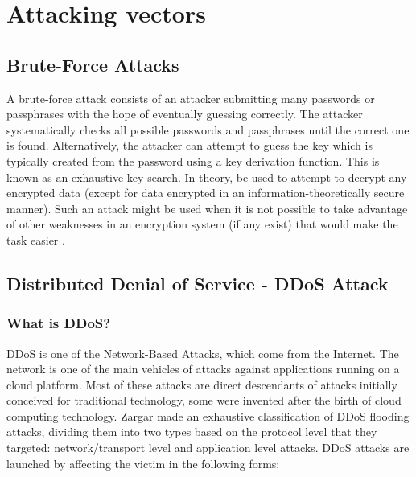 \documentclass[twocolumn]{article}
\begin{document}
\section{Attacking vectors}
\subsection{Brute-Force Attacks}

A brute-force attack consists of an attacker submitting many passwords or passphrases with the hope of eventually guessing correctly.
The attacker systematically checks all possible passwords and passphrases until the correct one is found. Alternatively, the attacker can attempt to guess the key which is typically created from the password using a key derivation function.
This is known as an exhaustive key search.
In theory, be used to attempt to decrypt any encrypted data (except for data encrypted in an information-theoretically secure manner). Such an attack might be used when it is not possible to take advantage of other weaknesses in an encryption system (if any exist) that would make the task easier \cite{kanakam2022bruteforce}.
\subsection{Distributed Denial of Service - DDoS Attack}
\subsubsection{What is DDoS?}
\par DDoS \cite{coppolino2017cloud} is one of the Network-Based Attacks, which come from the Internet. The network is one of the main vehicles of attacks against applications running on a cloud platform. Most of these attacks are direct descendants of attacks initially conceived for traditional technology, some were invented after the birth of cloud computing technology. Zargar \cite{coppolino2017cloud} made an exhaustive classification of DDoS flooding attacks, dividing them into two types based on the protocol level that they targeted: network/transport level and application level attacks. DDoS attacks are launched by affecting the victim in the following forms:
\end{document}
